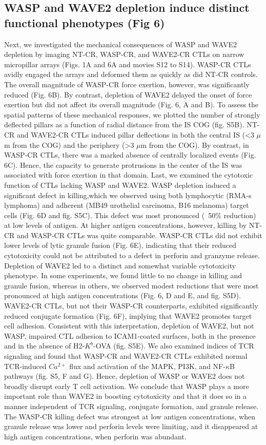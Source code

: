 \subsection{WASP and WAVE2 depletion induce distinct functional phenotypes (Fig 6)}
Next, we investigated the mechanical consequences of WASP and WAVE2 depletion by imaging NT-CR, WASP-CR, and WAVE2-CR CTLs on narrow micropillar arrays (Figs. 1A and 6A and movies S12 to S14). WASP-CR CTLs avidly engaged the arrays and deformed them as quickly as did NT-CR controls. The overall magnitude of WASP-CR force exertion, however, was significantly reduced (Fig. 6B). By contrast, depletion of WAVE2 delayed the onset of force exertion but did not affect its overall magnitude (Fig. 6, A and B). To assess the spatial patterns of these mechanical responses, we plotted the number of strongly deflected pillars as a function of radial distance from the IS COG (fig. S5B). NT-CR and WAVE2-CR CTLs induced pillar deflections in both the central IS (<3 $\mu$m from the COG) and the periphery (>3 $\mu$m from the COG). By contrast, in WASP-CR CTLs, there was a marked absence of centrally localized events (Fig. 6C). Hence, the capacity to generate protrusions in the center of the IS was associated with force exertion in that domain. Last, we examined the cytotoxic function of CTLs lacking WASP and WAVE2. WASP depletion induced a significant defect in killing,which we observed using both lymphocytic (RMA-s lymphoma) and adherent (MB49 urothelial carcinoma, B16 melanoma) target cells (Fig. 6D and fig. S5C). This defect was most pronounced (~50\% reduction) at low levels of antigen. At higher antigen concentrations, however, killing by NT-CR and WASP-CR CTLs was quite comparable. WASP-CR CTLs did not exhibit lower levels of lytic granule fusion (Fig. 6E), indicating that their reduced cytotoxicity could not be attributed to a defect in perforin and granzyme release. Depletion of WAVE2 led to a distinct and somewhat variable cytotoxicity phenotype. In some experiments, we found little to no change in killing and granule fusion, whereas in others, we observed modest reductions that were most pronounced at high antigen concentrations (Fig. 6, D and E, and fig. S5D). WAVE2-CR CTLs, but not their WASP-CR counterparts, exhibited significantly reduced conjugate formation (Fig. 6F), implying that WAVE2 promotes target cell adhesion. Consistent with this interpretation, depletion of WAVE2, but not WASP, impaired CTL adhesion to ICAM1-coated surfaces, both in the presence and in the absence of H2-$K^{b}$-OVA (fig. S5E). We also examined indices of TCR signaling and found that WASP-CR and WAVE2-CR CTLs exhibited normal TCR-induced $Ca^{2+}$ flux and activation of the MAPK, PI3K, and NF-$\kappa$B pathways (fig. S5, F and G). Hence, depletion of WASP or WAVE2 does not broadly disrupt early T cell activation. We conclude that WASP plays a more important role than WAVE2 in boosting cytotoxicity and that it does so in a manner independent of TCR signaling, conjugate formation, and granule release. The WASP-CR killing defect was strongest at low antigen concentrations, when granule release was lower and perforin levels were limiting, and it disappeared at high antigen concentrations, when perforin was abundant. 